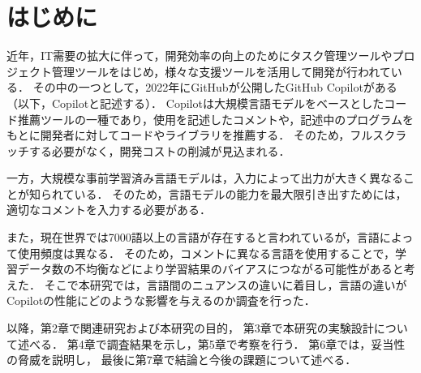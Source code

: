 \section{はじめに\label{intro}}
    近年，IT需要の拡大に伴って，開発効率の向上のためにタスク管理ツールやプロジェクト管理ツールをはじめ，様々な支援ツールを活用して開発が行われている．
    その中の一つとして，2022年にGitHubが公開したGitHub Copilotがある（以下，Copilotと記述する）．
    Copilotは大規模言語モデルをベースとしたコード推薦ツールの一種であり，使用を記述したコメントや，記述中のプログラムをもとに開発者に対してコードやライブラリを推薦する．
    そのため，フルスクラッチする必要がなく，開発コストの削減が見込まれる．

    一方，大規模な事前学習済み言語モデルは，入力によって出力が大きく異なることが知られている\cite{Yao2022ACL}．
    そのため，言語モデルの能力を最大限引き出すためには，適切なコメントを入力する必要がある．
    
    また，現在世界では7000語以上の言語が存在すると言われているが，言語によって使用頻度は異なる．
    そのため，コメントに異なる言語を使用することで，学習データ数の不均衡などにより学習結果のバイアスにつながる可能性があると考えた．
    そこで本研究では，言語間のニュアンスの違いに着目し，言語の違いがCopilotの性能にどのような影響を与えるのか調査を行った．

    以降，第2章で関連研究および本研究の目的，
    第3章で本研究の実験設計について述べる．
    第4章で調査結果を示し，第5章で考察を行う．
    第6章では，妥当性の脅威を説明し，
    最後に第7章で結論と今後の課題について述べる．
